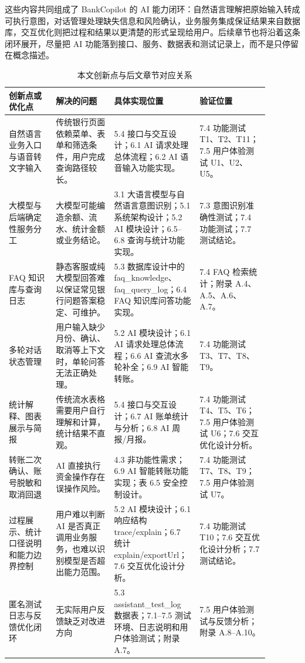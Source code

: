 \documentclass[bachelor, print]{xduthesis}
\begin{document}
这些内容共同组成了 BankCopilot 的 AI 能力闭环：自然语言理解把原始输入转成可执行意图，对话管理处理缺失信息和风险确认，业务服务集成保证结果来自数据库，交互优化则把过程和结果以更清楚的形式呈现给用户。后续章节也将沿着这条闭环展开，尽量把 AI 功能落到接口、服务、数据表和测试记录上，而不是只停留在概念描述。

\begin{table}[H]
    \centering
    \caption{本文创新点与后文章节对应关系}
    \label{tab:innovation-chapter-map}
    \scriptsize
    \setlength{\tabcolsep}{2pt}
    \renewcommand{\arraystretch}{1.15}
    \begin{tabular}{|p{0.17\linewidth}|p{0.21\linewidth}|p{0.25\linewidth}|p{0.25\linewidth}|}
        \hline
        创新点或优化点 & 解决的问题 & 具体实现位置 & 验证位置 \\
        \hline
        自然语言业务入口与语音转文字输入 & 传统银行页面依赖菜单、表单和筛选条件，用户完成查询路径较长。 & 5.4 接口与交互设计；6.1 AI 请求处理总体流程；6.2 AI 语音输入功能实现。 & 7.4 功能测试 T1、T2、T11；7.5 用户体验测试 U1、U2、U5。 \\
        \hline
        大模型与后端确定性服务分工 & 大模型可能编造余额、流水、统计金额或业务结论。 & 3.1 大语言模型与自然语言意图识别；5.1 系统架构设计；5.2 AI 模块设计；6.5--6.8 查询与统计功能实现。 & 7.3 意图识别准确性测试；7.4 功能测试；7.7 测试结论。 \\
        \hline
        FAQ 知识库与查询日志 & 静态客服或纯大模型回答难以保证常见银行问题答案稳定、可维护。 & 5.3 数据库设计中的 faq\_knowledge、faq\_query\_log；6.4 FAQ 知识库问答功能实现。 & 7.4 FAQ 检索统计；附录 A.4、A.5、A.6、A.7。 \\
        \hline
        多轮对话状态管理 & 用户输入缺少月份、确认、取消等上下文时，单轮问答无法正确处理。 & 5.2 AI 模块设计；6.1 AI 请求处理总体流程；6.6 AI 查流水多轮补全；6.9 AI 智能转账。 & 7.4 功能测试 T3、T7、T8、T9。 \\
        \hline
        统计解释、图表展示与简报 & 传统流水表格需要用户自行理解和计算，统计结果不直观。 & 5.4 接口与交互设计；6.7 AI 账单统计与分析；6.8 AI 周报/月报。 & 7.4 功能测试 T4、T5、T6；7.5 用户体验测试 U6；7.6 交互优化设计分析。 \\
        \hline
        转账二次确认、账号脱敏和取消回退 & AI 直接执行资金操作存在误操作风险。 & 4.3 非功能性需求；6.9 AI 智能转账功能实现；表 6.5 安全控制设计。 & 7.4 功能测试 T7、T8、T9；7.5 用户体验测试 U7。 \\
        \hline
        过程展示、统计口径说明和能力边界控制 & 用户难以判断 AI 是否真正调用业务服务，也难以识别模型是否超出能力范围。 & 5.2 AI 模块设计；6.1 响应结构 trace/explain；6.7 统计 explain/exportUrl；7.6 交互优化设计分析。 & 7.4 功能测试 T10；7.6 交互优化设计分析；7.7 测试结论。 \\
        \hline
        匿名测试日志与反馈优化闭环 & 无实际用户反馈缺乏对改进方向 & 5.3 assistant\_test\_log 数据表；7.1--7.5 测试环境、日志说明和用户体验测试；附录 A.7。 & 7.5 用户体验测试与反馈分析；附录 A.8--A.10。 \\
        \hline
    \end{tabular}
\end{table}
\end{document}
